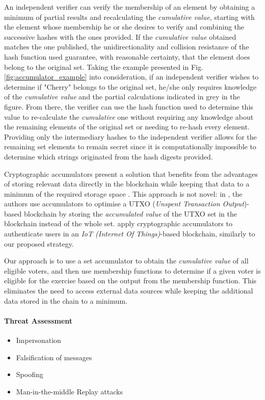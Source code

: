 \documentclass[../main.tex]{subfiles}
\begin{document}
                An independent verifier can verify the membership of an element by obtaining a minimum of partial results and recalculating the \textit{cumulative value}, starting with the element whose membership he or she desires to verify and combining the successive hashes with the ones provided. If the \textit{cumulative value} obtained matches the one published, the unidirectionality and collision resistance of the hash function used guarantee, with reasonable certainty, that the element does belong to the original set. Taking the example presented in Fig. \ref{fig:accumulator_example} into consideration, if an independent verifier wishes to determine if "Cherry" belongs to the original set, he/she only requires knowledge of the \textit{cumulative value} and the partial calculations indicated in grey in the figure. From there, the verifier can use the hash function used to determine this value to re-calculate the \textit{cumulative} one without requiring any knowledge about the remaining elements of the original set or needing to re-hash every element. Providing only the intermediary hashes to the independent verifier allows for the remaining set elements to remain secret since it is computationally impossible to determine which strings originated from the hash digests provided.
                \par
                Cryptographic accumulators present a solution that benefits from the advantages of storing relevant data directly in the blockchain while keeping that data to a minimum of the required storage space \cite{Wang2021a}. This approach is not novel: in \cite{Chen2020}, the authors use accumulators to optimise a UTXO (\textit{Unspent Transaction Output})-based blockchain by storing the \textit{accumulated value} of the UTXO set in the blockchain instead of the whole set. \cite{Wang2022} apply cryptographic accumulators to authenticate users in an \textit{IoT (Internet Of Things)}-based blockchain, similarly to our proposed strategy.
                \par
                Our approach is to use a set accumulator to obtain the \textit{cumulative value} of all eligible voters, and then use membership functions to determine if a given voter is eligible for the exercise based on the output from the membership function. This eliminates the need to access external data sources while keeping the additional data stored in the chain to a minimum.

                \paragraph{Threat Assessment}
                \begin{itemize}
                    \item{Impersonation}
                    \item{Falsification of messages}
                    \item{Spoofing}
                    \item{Man-in-the-middle Replay attacks}
                \end{itemize}
\end{document}
